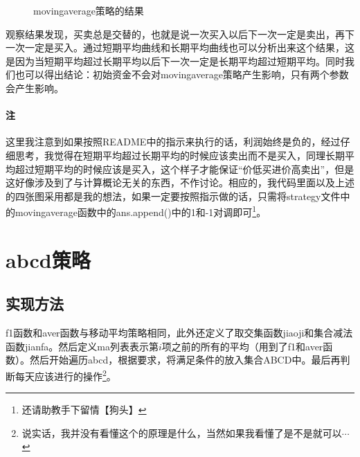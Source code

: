 \documentclass{ctexart}
\begin{document}
	\begin{figure}[H]
		\centering
		\caption{movingaverage策略的结果}
	\end{figure}
	观察结果发现，买卖总是交替的，也就是说一次买入以后下一次一定是卖出，再下一次一定是买入。通过短期平均曲线和长期平均曲线也可以分析出来这个结果，这是因为当短期平均超过长期平均以后下一次一定是长期平均超过短期平均。同时我们也可以得出结论：初始资金不会对movingaverage策略产生影响，只有两个参数会产生影响。
	\paragraph{注}这里我注意到如果按照README中的指示来执行的话，利润始终是负的，经过仔细思考，我觉得在短期平均超过长期平均的时候应该卖出而不是买入，同理长期平均超过短期平均的时候应该是买入，这个样子才能保证“价低买进价高卖出”，但是这好像涉及到了与计算概论无关的东西，不作讨论。相应的，我代码里面以及上述的四张图采用都是我的想法，如果一定要按照指示做的话，只需将strategy文件中的movingaverage函数中的ans.append()中的1和-1对调即可\footnote{还请助教手下留情【狗头】}。
	\section{abcd策略}
	\subsection{实现方法}
	f1函数和aver函数与移动平均策略相同，此外还定义了取交集函数jiaoji和集合减法函数jianfa。然后定义ma列表表示第$i$项之前的所有的平均（用到了f1和aver函数）。然后开始遍历abcd，根据要求，将满足条件的放入集合ABCD中。最后再判断每天应该进行的操作\footnote{说实话，我并没有看懂这个的原理是什么，当然如果我看懂了是不是就可以$\cdots$}。
\end{document}
